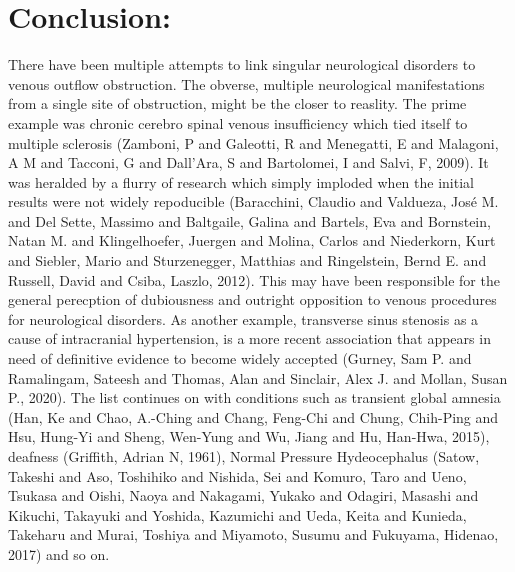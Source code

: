 \documentclass{article}
\begin{document}
\section*{Conclusion:}
\label{sec:org4c1a14a}
There have been multiple attempts to link singular neurological disorders to venous outflow obstruction.
The obverse, multiple neurological manifestations from a single site of obstruction,  might be the closer to reaslity.
The prime example was chronic cerebro spinal venous insufficiency which tied itself to multiple sclerosis (Zamboni, P and Galeotti, R and Menegatti, E and Malagoni, A M and Tacconi, G and Dall’Ara, S and Bartolomei, I and Salvi, F, 2009).
It was heralded by a flurry of research which simply imploded when the initial results were not widely repoducible (Baracchini, Claudio and Valdueza, José M. and Del Sette, Massimo and Baltgaile, Galina and Bartels, Eva and Bornstein, Natan M. and Klingelhoefer, Juergen and Molina, Carlos and Niederkorn, Kurt and Siebler, Mario and Sturzenegger, Matthias and Ringelstein, Bernd E. and Russell, David and Csiba, Laszlo, 2012).
This may have been responsible for the general perecption of dubiousness and outright opposition to venous procedures for neurological disorders.
As another example, transverse sinus stenosis as a cause of intracranial hypertension, is a more recent association that appears in need of definitive evidence to become widely accepted (Gurney, Sam P. and Ramalingam, Sateesh and Thomas, Alan and Sinclair, Alex J. and Mollan, Susan P., 2020).
The list continues on with conditions such as transient global amnesia (Han, Ke and Chao, A.-Ching and Chang, Feng-Chi and Chung, Chih-Ping and Hsu, Hung-Yi and Sheng, Wen-Yung and Wu, Jiang and Hu, Han-Hwa, 2015), deafness (Griffith, Adrian N, 1961), Normal Pressure Hydeocephalus (Satow, Takeshi and Aso, Toshihiko and Nishida, Sei and Komuro, Taro and Ueno, Tsukasa and Oishi, Naoya and Nakagami, Yukako and Odagiri, Masashi and Kikuchi, Takayuki and Yoshida, Kazumichi and Ueda, Keita and Kunieda, Takeharu and Murai, Toshiya and Miyamoto, Susumu and Fukuyama, Hidenao, 2017) and so on.
\end{document}
